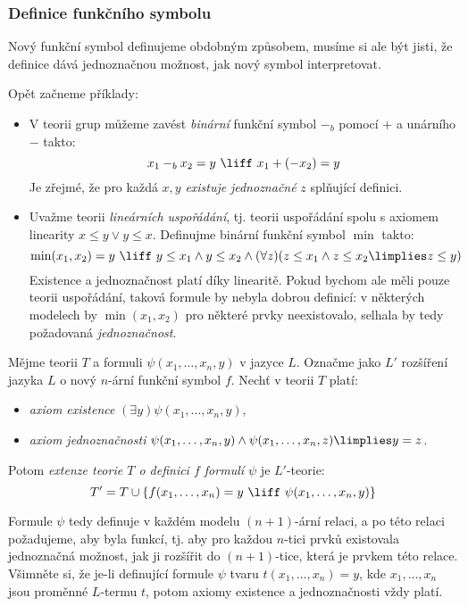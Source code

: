 \subsubsection*{Definice funkčního symbolu}

Nový funkční symbol definujeme obdobným způsobem, musíme si ale být jisti, že definice dává jednoznačnou možnost, jak nový symbol interpretovat.

\begin{example}
    Opět začneme příklady:
    \begin{itemize}
        \item V teorii grup můžeme zavést \emph{binární} funkční symbol $-_b$ pomocí $+$ a unárního $-$ takto:
        $$
        x_1 -_b x_2 = y\ \liff\ x_1 + (-x_2) = y
        $$
        Je zřejmé, že pro každá $x,y$ \emph{existuje} \emph{jednoznačné} $z$ splňující definici.        
        \item Uvažme teorii \emph{lineárních uspořádání}, tj. teorii uspořádání spolu s axiomem linearity $x\leq y\lor y\leq x$. Definujme binární funkční symbol $\min$ takto: 
        $$
        \min(x_1,x_2)=y\ \liff\ y\leq x_1\land y\leq x_2\land (\forall z)(z\leq x_1\land z\leq x_2\limplies z\leq y)
        $$
        Existence a jednoznačnost platí díky linearitě. Pokud bychom ale měli pouze teorii uspořádání, taková formule by nebyla dobrou definicí: v některých modelech by $\min(x_1,x_2)$ pro některé prvky neexistovalo, selhala by tedy požadovaná \emph{jednoznačnost}.
    \end{itemize}
\end{example}

\begin{definition}
    Mějme teorii $T$ a formuli $\psi(x_1,\dots,x_n,y)$ v jazyce $L$. Označme jako $L'$ rozšíření jazyka $L$ o nový $n$-ární funkční symbol $f$. Nechť v teorii $T$ platí:
    \begin{itemize}
        \item \emph{axiom existence} $(\exists y)\psi(x_1,\dots,x_n,y)$, 
        \item \emph{axiom jednoznačnosti} $\psi(x_1,\dots,x_n,y)\land \psi(x_1,\dots,x_n,z)\limplies y=z$.
    \end{itemize}
    Potom \emph{extenze teorie $T$ o definici $f$ formulí $\psi$} je $L'$-teorie: 
    $$T'=T\cup\{f(x_1,\dots,x_n)=y\ \liff\ \psi(x_1,\dots,x_n,y)\}$$
\end{definition}

Formule $\psi$ tedy definuje v každém modelu $(n+1)$-ární relaci, a po této relaci požadujeme, aby byla funkcí, tj. aby pro každou $n$-tici prvků existovala jednoznačná možnost, jak ji rozšířit do $(n+1)$-tice, která je prvkem této relace. Všimněte si, že je-li definující formule $\psi$ tvaru $t(x_1,\dots,x_n)=y$, kde $x_1,\dots,x_n$ jsou proměnné $L$-termu $t$, potom axiomy existence a jednoznačnosti vždy platí.

